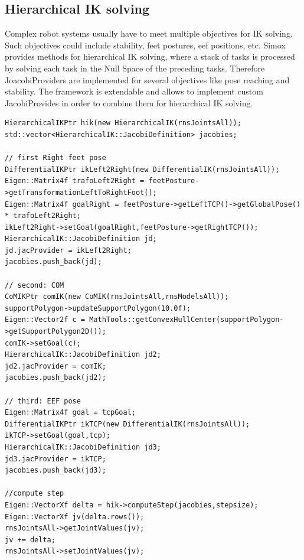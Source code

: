 \subsection{Hierarchical IK solving}
Complex robot systems usually have to meet multiple objectives for IK solving. Such objectives could include stability, feet postures, eef positions, etc. Simox provides methods for hierarchical IK solving, where a stack of tasks is processed by solving each task in the Null Space of the preceding tasks. Therefore JoacobiProviders are implemented for several objectives like pose reaching and stability. The framework is extendable and allows to implement custom JacobiProvides in order to combine them for hierarchical IK solving.
\begin{lstlisting}
HierarchicalIKPtr hik(new HierarchicalIK(rnsJointsAll));
std::vector<HierarchicalIK::JacobiDefinition> jacobies;

// first Right feet pose
DifferentialIKPtr ikLeft2Right(new DifferentialIK(rnsJointsAll));
Eigen::Matrix4f trafoLeft2Right = feetPosture->getTransformationLeftToRightFoot();
Eigen::Matrix4f goalRight = feetPosture->getLeftTCP()->getGlobalPose() * trafoLeft2Right;
ikLeft2Right->setGoal(goalRight,feetPosture->getRightTCP());
HierarchicalIK::JacobiDefinition jd;
jd.jacProvider = ikLeft2Right;
jacobies.push_back(jd);

// second: COM
CoMIKPtr comIK(new CoMIK(rnsJointsAll,rnsModelsAll));
supportPolygon->updateSupportPolygon(10.0f);
Eigen::Vector2f c = MathTools::getConvexHullCenter(supportPolygon->getSupportPolygon2D());
comIK->setGoal(c); 
HierarchicalIK::JacobiDefinition jd2;
jd2.jacProvider = comIK;
jacobies.push_back(jd2);

// third: EEF pose
Eigen::Matrix4f goal = tcpGoal;
DifferentialIKPtr ikTCP(new DifferentialIK(rnsJointsAll));
ikTCP->setGoal(goal,tcp);
HierarchicalIK::JacobiDefinition jd3;
jd3.jacProvider = ikTCP;
jacobies.push_back(jd3);

//compute step
Eigen::VectorXf delta = hik->computeStep(jacobies,stepsize);
Eigen::VectorXf jv(delta.rows());
rnsJointsAll->getJointValues(jv);
jv += delta;
rnsJointsAll->setJointValues(jv);
\end{lstlisting}
